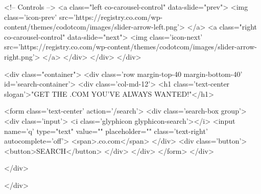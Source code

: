             <!-- Controls -->
            <a class="left co-carousel-control" data-slide="prev">
                <img class='icon-prev' src='https://registry.co.com/wp-content/themes/codotcom/images/slider-arrow-left.png'>
            </a>
            <a class="right co-carousel-control" data-slide="next">
                <img class='icon-next' src='https://registry.co.com/wp-content/themes/codotcom/images/slider-arrow-right.png'>
            </a>
        </div>
    </div>
</div>

	<div class="container">
        <div class='row margin-top-40 margin-bottom-40' id='search-container'>
            <div class='col-md-12'>
                <h1 class='text-center slogan'>"GET THE .COM YOU'VE ALWAYS WANTED!"</h1>


                <form class='text-center' action='/search'>
                    <div class='search-box group'>
                        <div class='input'> 
                            <i class='glyphicon glyphicon-search'></i>
                            <input name='q' type="text" value="" placeholder="" class='text-right' autocomplete='off'>
                            <span>.co.com</span>
                        </div>
                        <div class='button'>
                            <button>SEARCH</button>
                        </div>
                    </div>
                </form>
            </div>

        </div>


    </div>

